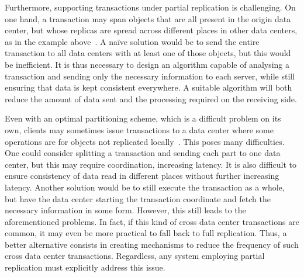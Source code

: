 Furthermore, supporting transactions under partial replication is challenging.
On one hand, a transaction may span objects that are all present in the origin data center, but whose replicas are spread across
different places in other data centers, as in the example above~\cite{spanner}.
A naïve solution would be to send the entire transaction to all data centers with at least one of those objects, but this would be
inefficient.
It is thus necessary to design an algorithm capable of analysing a transaction and sending only the necessary information
to each server, while still ensuring that data is kept consistent everywhere.
A suitable algorithm will both reduce the amount of data sent and the processing required on the receiving side.

Even with an optimal partitioning scheme, which is a difficult problem on its own, clients may sometimes issue transactions to
a data center where some operations are for objects not replicated locally~\cite{sipre}.
This poses many difficulties.
One could consider splitting a transaction and sending each part to one data center, but this may require coordination, increasing
latency.
It is also difficult to ensure consistency of data read in different places without further increasing latency.
Another solution would be to still execute the transaction as a whole, but have the data center starting the transaction
coordinate and fetch the necessary information in some form.
However, this still leads to the aforementioned problems.
In fact, if this kind of cross data center transactions are common, it may even be more practical to fall back to full replication.
Thus, a better alternative consists in creating mechanisms to reduce the frequency of such cross data center transactions.
Regardless, any system employing partial replication must explicitly address this issue.


